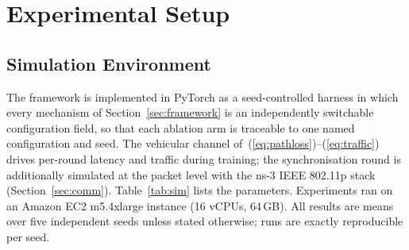 \documentclass[journal]{IEEEtran}
\begin{document}
\section{Experimental Setup}
\label{sec:setup}

\subsection{Simulation Environment}
The framework is implemented in PyTorch as a seed-controlled harness in which
every mechanism of Section~\ref{sec:framework} is an independently switchable
configuration field, so that each ablation arm is traceable to one named
configuration and seed. The vehicular channel of~(\ref{eq:pathloss})--(\ref{eq:traffic})
drives per-round latency and traffic during training; the synchronisation round
is additionally simulated at the packet level with the ns-3 IEEE 802.11p stack
(Section~\ref{sec:comm}). Table~\ref{tab:sim} lists the parameters. Experiments
ran on an Amazon EC2 m5.4xlarge instance (16 vCPUs, 64\,GB). All results are
means over five independent seeds unless stated otherwise; runs are exactly
reproducible per seed.
\end{document}
